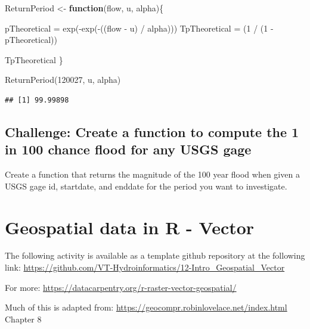 \documentclass[
]{book}
\newenvironment{Shaded}{\begin{snugshade}}{\end{snugshade}}
\newcommand{\ControlFlowTok}[1]{\textcolor[rgb]{0.13,0.29,0.53}{\textbf{#1}}}
\newcommand{\DecValTok}[1]{\textcolor[rgb]{0.00,0.00,0.81}{#1}}
\newcommand{\FunctionTok}[1]{\textcolor[rgb]{0.00,0.00,0.00}{#1}}
\newcommand{\NormalTok}[1]{#1}
\newcommand{\OtherTok}[1]{\textcolor[rgb]{0.56,0.35,0.01}{#1}}
\newcommand{\SpecialCharTok}[1]{\textcolor[rgb]{0.00,0.00,0.00}{#1}}
\begin{document}
\begin{Shaded}
\begin{Highlighting}[]
\NormalTok{ReturnPeriod }\OtherTok{\textless{}{-}} \ControlFlowTok{function}\NormalTok{(flow, u, alpha)\{}
  
\NormalTok{  pTheoretical }\OtherTok{=} \FunctionTok{exp}\NormalTok{(}\SpecialCharTok{{-}}\FunctionTok{exp}\NormalTok{(}\SpecialCharTok{{-}}\NormalTok{((flow }\SpecialCharTok{{-}}\NormalTok{ u) }\SpecialCharTok{/}\NormalTok{ alpha)))}
\NormalTok{  TpTheoretical }\OtherTok{=}\NormalTok{ (}\DecValTok{1} \SpecialCharTok{/}\NormalTok{ (}\DecValTok{1} \SpecialCharTok{{-}}\NormalTok{ pTheoretical))}
  
\NormalTok{  TpTheoretical}
\NormalTok{\}}

\FunctionTok{ReturnPeriod}\NormalTok{(}\DecValTok{120027}\NormalTok{, u, alpha)}
\end{Highlighting}
\end{Shaded}

\begin{verbatim}
## [1] 99.99898
\end{verbatim}

\hypertarget{challenge-create-a-function-to-compute-the-1-in-100-chance-flood-for-any-usgs-gage}{%
\section{Challenge: Create a function to compute the 1 in 100 chance flood for any USGS gage}\label{challenge-create-a-function-to-compute-the-1-in-100-chance-flood-for-any-usgs-gage}}

Create a function that returns the magnitude of the 100 year flood when given a USGS gage id, startdate, and enddate for the period you want to investigate.

\hypertarget{rgeospatial}{%
\chapter{Geospatial data in R - Vector}\label{rgeospatial}}

The following activity is available as a template github repository at the following link: \url{https://github.com/VT-Hydroinformatics/12-Intro_Geospatial_Vector}

For more: \url{https://datacarpentry.org/r-raster-vector-geospatial/}

Much of this is adapted from: \url{https://geocompr.robinlovelace.net/index.html} Chapter 8
\end{document}

